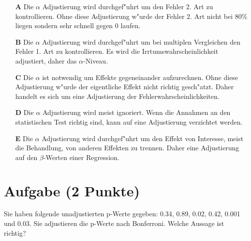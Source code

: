 \documentclass[a4paper, 10pt]{scrartcl}\usepackage[]{graphicx}\usepackage[]{xcolor}
\begin{document}
\begin{enumerate}
\item [\textbf{A} \msquare] Die $\alpha$ Adjustierung wird durchgef{"u}hrt um den Fehler 2. Art zu kontrollieren. Ohne diese Adjustierung w{"u}rde der Fehler 2. Art nicht bei 80\% liegen sondern sehr schnell gegen 0 laufen.
\item [\textbf{B} \msquare] Die $\alpha$ Adjustierung wird durchgef{"u}hrt um bei multiplen Vergleichen den Fehler 1. Art zu kontrollieren. Es wird die Irrtumswahrscheinlichkeit adjustiert, daher das $\alpha$-Niveau.
\item [\textbf{C} \msquare] Die $\alpha$ ist notwendig um Effekte gegeneinander aufzurechnen. Ohne diese Adjustierung w{"u}rde der eigentliche Effekt nicht richtig gesch{"a}tzt. Daher handelt es sich um eine Adjustierung der Fehlerwahrscheinlichkeiten.
\item [\textbf{D} \msquare] Die $\alpha$ Adjustierung wird meist ignoriert. Wenn die Annahmen an den statistischen Test richtig sind, kann auf eine Adjustierung verzichtet werden.
\item [\textbf{E} \msquare] Die $\alpha$ Adjustierung wird durchgef{"u}hrt um den Effekt von Interesse, meist die Behandlung, von anderen Effekten zu trennen. Daher eine Adjustierung auf den $\beta$-Werten einer Regression.
\end{enumerate} 

\section{Aufgabe \hfill (2 Punkte)}



Sie haben folgende unadjustierten p-Werte gegeben: 0.34, 0.89, 0.02, 0.42, 0.001 und 0.03. Sie adjustieren die p-Werte nach
Bonferroni. Welche Aussage ist richtig?
\end{document}
